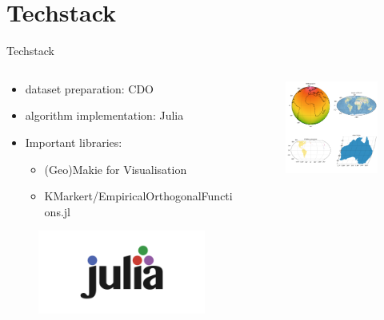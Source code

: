 \section{Techstack}

\begin{frame}{Techstack}

  \begin{columns}
    \begin{column}{.5\columnwidth}
      \begin{itemize}
        \item dataset preparation: CDO \cite{schulzweida2019cdo}
        \item algorithm implementation: Julia \cite{gao_julia_2020}
        \item Important libraries:
          \begin{itemize}
            \item (Geo)Makie for Visualisation
            \item KMarkert/EmpiricalOrthogonalFunctions.jl
          \end{itemize}
        
      \end{itemize}  
    \begin{figure}[h]
      \centering
      \includegraphics[width=.5 \columnwidth]{imglib/julialang_logo.png}
    \end{figure}
    \end{column}
    \begin{column}{.5\columnwidth}
    \begin{figure}[h]
      \centering
      \includegraphics[width=.7 \columnwidth]{imglib/geomakie_examples.png}
    \end{figure}
      
    \end{column}
  \end{columns}
  
\end{frame}

